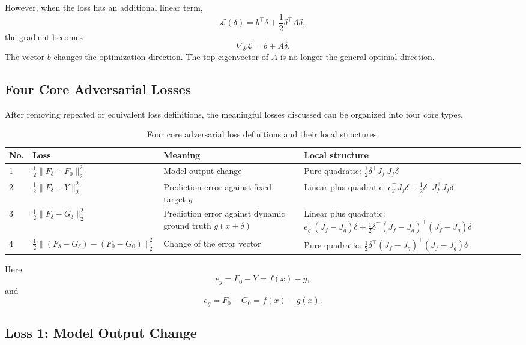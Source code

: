 \documentclass{article}
\begin{document}
However, when the loss has an additional linear term,
\[
    \mathcal{L}(\delta)
    =
    b^\top \delta
    +
    \frac{1}{2}\delta^\top A\delta,
\]
the gradient becomes
\[
    \nabla_\delta \mathcal{L}
    =
    b+A\delta.
\]
The vector \(b\) changes the optimization direction. The top eigenvector of \(A\) is no longer the general optimal direction.

\subsection{Four Core Adversarial Losses}

After removing repeated or equivalent loss definitions, the meaningful losses discussed can be organized into four core types.

\begin{table}[h]
\centering
\begin{tabular}{p{0.8cm} p{4.4cm} p{4.8cm} p{4.2cm}}
\hline
No. & Loss & Meaning & Local structure \\
\hline
1 &
\(\displaystyle \frac{1}{2}\|F_\delta-F_0\|_2^2\)
&
Model output change
&
Pure quadratic:
\(\displaystyle \frac{1}{2}\delta^\top J_f^\top J_f\delta\)
\\[1.2em]

2 &
\(\displaystyle \frac{1}{2}\|F_\delta-Y\|_2^2\)
&
Prediction error against fixed target \(y\)
&
Linear plus quadratic:
\(\displaystyle e_y^\top J_f\delta+\frac{1}{2}\delta^\top J_f^\top J_f\delta\)
\\[1.2em]

3 &
\(\displaystyle \frac{1}{2}\|F_\delta-G_\delta\|_2^2\)
&
Prediction error against dynamic ground truth \(g(x+\delta)\)
&
Linear plus quadratic:
\(\displaystyle e_g^\top (J_f-J_g)\delta+\frac{1}{2}\delta^\top (J_f-J_g)^\top(J_f-J_g)\delta\)
\\[1.2em]

4 &
\(\displaystyle \frac{1}{2}\|(F_\delta-G_\delta)-(F_0-G_0)\|_2^2\)
&
Change of the error vector
&
Pure quadratic:
\(\displaystyle \frac{1}{2}\delta^\top (J_f-J_g)^\top(J_f-J_g)\delta\)
\\
\hline
\end{tabular}
\caption{Four core adversarial loss definitions and their local structures.}
\end{table}

Here
\[
    e_y = F_0-Y = f(x)-y,
\]
and
\[
    e_g = F_0-G_0 = f(x)-g(x).
\]

\subsection{Loss 1: Model Output Change}
\end{document}
